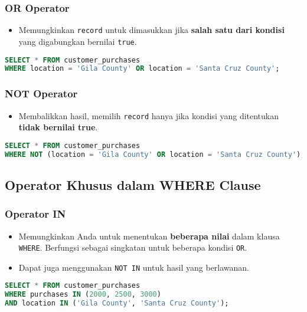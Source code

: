 \documentclass{article}
\begin{document}
\subsubsection{OR Operator}
\begin{itemize}
    \item Memungkinkan \texttt{record} untuk dimasukkan jika \textbf{salah satu dari kondisi} yang digabungkan bernilai \texttt{true}.
\end{itemize}
\begin{lstlisting}[language=SQL, caption={Contoh Penggunaan OR}, captionpos=b]
SELECT * FROM customer_purchases
WHERE location = 'Gila County' OR location = 'Santa Cruz County';
\end{lstlisting}

\subsubsection{NOT Operator}
\begin{itemize}
    \item Membalikkan hasil, memilih \texttt{record} hanya jika kondisi yang ditentukan \textbf{tidak bernilai true}.
\end{itemize}
\begin{lstlisting}[language=SQL, caption={Contoh Penggunaan NOT}, captionpos=b]
SELECT * FROM customer_purchases
WHERE NOT (location = 'Gila County' OR location = 'Santa Cruz County');
\end{lstlisting}

\subsection{Operator Khusus dalam WHERE Clause}

\subsubsection{Operator IN}
\begin{itemize}
    \item Memungkinkan Anda untuk menentukan \textbf{beberapa nilai} dalam klausa \texttt{WHERE}. Berfungsi sebagai singkatan untuk beberapa kondisi \texttt{OR}.
    \item Dapat juga menggunakan \texttt{NOT IN} untuk hasil yang berlawanan.
\end{itemize}
\begin{lstlisting}[language=SQL, caption={Contoh Penggunaan IN}, captionpos=b]
SELECT * FROM customer_purchases
WHERE purchases IN (2000, 2500, 3000)
AND location IN ('Gila County', 'Santa Cruz County');
\end{lstlisting}
\end{document}

